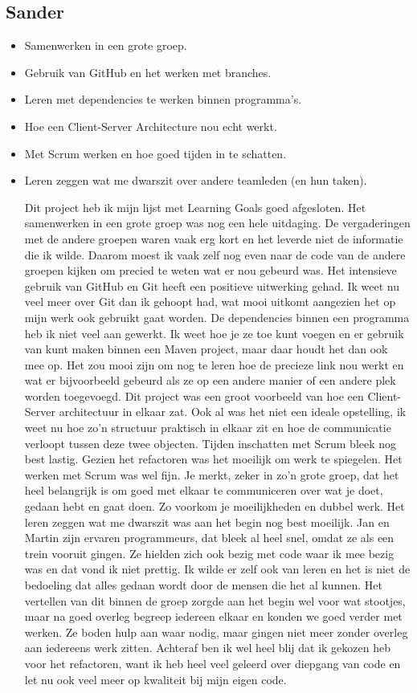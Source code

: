 \documentclass{article}
\begin{document}
\subsection*{Sander}
\begin{itemize}
	\item Samenwerken in een grote groep.
	\item Gebruik van GitHub en het werken met branches.
	\item Leren met dependencies te werken binnen programma's.
	\item Hoe een Client-Server Architecture nou echt werkt.
	\item Met Scrum werken en hoe goed tijden in te schatten.
	\item Leren zeggen wat me dwarszit over andere teamleden (en hun taken).
	
	Dit project heb ik mijn lijst met Learning Goals goed afgesloten. 
	Het samenwerken in een grote groep was nog een hele uitdaging. De vergaderingen met de andere groepen waren vaak erg kort en het leverde niet de informatie die ik wilde. Daarom moest ik vaak zelf nog even naar de code van de andere groepen kijken om precied te weten wat er nou gebeurd was.
	Het intensieve gebruik van GitHub en Git heeft een positieve uitwerking gehad. Ik weet nu veel meer over Git dan ik gehoopt had, wat mooi uitkomt aangezien het op mijn werk ook gebruikt gaat worden.
	De dependencies binnen een programma heb ik niet veel aan gewerkt. Ik weet hoe je ze toe kunt voegen en er gebruik van kunt maken binnen een Maven project, maar daar houdt het dan ook mee op. Het zou mooi zijn om nog te leren hoe de precieze link nou werkt en wat er bijvoorbeeld gebeurd als ze op een andere manier of een andere plek worden toegevoegd.
	Dit project was een groot voorbeeld van hoe een Client-Server architectuur in elkaar zat. Ook al was het niet een ideale opstelling, ik weet nu hoe zo'n structuur praktisch in elkaar zit en hoe de communicatie verloopt tussen deze twee objecten.
	Tijden inschatten met Scrum bleek nog best lastig. Gezien het refactoren was het moeilijk om werk te spiegelen. Het werken met Scrum was wel fijn. Je merkt, zeker in zo'n grote groep, dat het heel belangrijk is om goed met elkaar te communiceren over wat je doet, gedaan hebt en gaat doen. Zo voorkom je moeilijkheden en dubbel werk.
	Het leren zeggen wat me dwarszit was aan het begin nog best moeilijk. Jan en Martin zijn ervaren programmeurs, dat bleek al heel snel, omdat ze als een trein vooruit gingen. Ze hielden zich ook bezig met code waar ik mee bezig was en dat vond ik niet prettig. Ik wilde er zelf ook van leren en het is niet de bedoeling dat alles gedaan wordt door de mensen die het al kunnen.
	Het vertellen van dit binnen de groep zorgde aan het begin wel voor wat stootjes, maar na goed overleg begreep iedereen elkaar en konden we goed verder met werken. Ze boden hulp aan waar nodig, maar gingen niet meer zonder overleg aan iedereens werk zitten.
	Achteraf ben ik wel heel blij dat ik gekozen heb voor het refactoren, want ik heb heel veel geleerd over diepgang van code en let nu ook veel meer op kwaliteit bij mijn eigen code.
	
\end{itemize}
\end{document}
